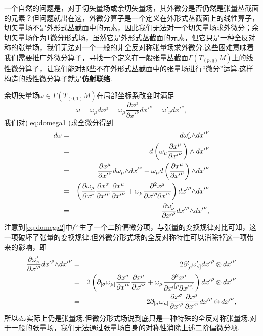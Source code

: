 		一个自然的问题是，对于切矢量场或余切矢量场，其外微分是否仍然是张量丛截面的元素？但问题就出在这，外微分算子是一个定义在外形式丛截面上的线性算子，切矢量场不是外形式丛截面中的元素，因此我们无法对一个切矢量场求外微分；余切矢量场作为1微分形式场，虽然它是外形式丛截面的元素，但它只是一种全反对称的张量场，我们无法对一个一般的非全反对称张量场求外微分.这些困难意味着我们需要推广外微分算子，寻找一个定义在一般张量丛截面$\varGamma(T_{(p,q)}M)$上的线性微分算子，让我们能对那些不在外形式丛截面中的张量场进行“微分”运算.这样构造的线性微分算子就是\textbf{仿射联络}.
		\begin{remark}
		余切矢量场$\omega\in \varGamma(T_{(0,1)}M)$在局部坐标系改变时满足
		\begin{equation}\label{eq:domega1}
				\omega=\omega_\mu dx^\mu=\omega_\mu\frac{\partial{x}^\mu}{\partial {x'}^\nu}d{x'}^\nu=\omega'_\nu d{x'}^\nu,
		\end{equation}
		我们对(\ref{eq:domega1})求全微分得到
		\begin{eqnarray}\label{eq:domega2}
			d\omega &=&d\omega'_\nu{\wedge}d{x'}^\nu\notag\\
			&=&d\left(\omega_\mu\frac{\partial{x}^\mu}{{\partial}{x'}^\nu}\right)\wedge d{x'}^\nu\notag\\
			&=&\frac{\partial{x}^\mu}{{\partial}{x'}^\nu}d\omega_\mu{\wedge}d{x'}^\nu+\omega_{\mu}d\left(\frac{\partial{x}^\mu}{\partial {x'}^\nu}\right){\wedge}d{x'}^\nu\notag\\
			&=&\left(\frac{\partial{\omega}_\mu}{{\partial}{x}^\sigma}\frac{\partial{x}^\sigma}{\partial {x'}^\rho}\frac{\partial{x}^\mu}{{\partial}{x'}^\nu}+{\omega}_\mu\frac{\partial^2{x}^\mu}{\partial {x'}^\rho{\partial}{x'}^\nu}\right)d{x'}^\rho{\wedge}d{x'}^\nu\\
			&=&\frac{\partial\omega'_\nu}{{\partial}{x'}^\rho}d{x'}^\rho{\wedge}d{x'}^\nu\notag,
		\end{eqnarray}
		注意到\ref{eq:domega2}中产生了一个二阶偏微分项，与张量的变换规律对比可知，这一项破坏了张量的变换规律.但外微分形式场的全反对称特性可以消除掉这一项带来的影响，即
		\begin{eqnarray}
			\frac{\partial\omega'_\nu}{{\partial}{x'}^\rho}d{x'}^\rho{\wedge}d{x'}^\nu&=&2\partial'_{[\rho}\omega'_{\nu]}{dx'}^{\rho}\otimes{dx'}^\nu\notag\\
				&=&2\left(\partial_{[\sigma}\omega_{\mu]}\frac{\partial{x}^\sigma}{\partial {x'}^\rho}\frac{\partial{x}^\mu}{{\partial}{x'}^\nu}+{\omega}_\mu\frac{\partial^2{x}^\mu}{\partial {x'}^{[\rho}{\partial}{x'}^{\nu]}}\right){dx'}^{\rho}\otimes{dx'}^\nu\notag\\
			&=&2\partial_{[\sigma}\omega_{\mu]}\frac{\partial{x}^\sigma}{\partial {x'}^\rho}\frac{\partial{x}^\mu}{{\partial}{x'}^\nu}{dx'}^{\rho}\otimes{dx'}^\nu,
		\end{eqnarray}
		所以$d\omega$实际上仍是张量场.但微分形式场说到底只是一种特殊的全反对称张量场,对于一般的张量场，我们无法通过张量场自身的对称性消除上述二阶偏微分项.
		\end{remark}

